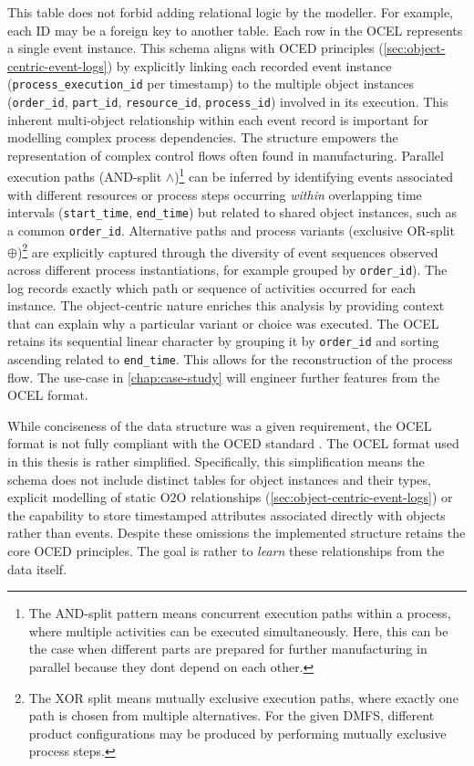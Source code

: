 This table does not forbid adding relational logic by the modeller. For example, each ID may be a foreign key to another table. Each row in the OCEL represents a single event instance. This schema aligns with OCED principles (\autoref{sec:object-centric-event-logs}) by explicitly linking each recorded event instance (\texttt{process\_execution\_id} per timestamp) to the multiple object instances (\texttt{order\_id}, \texttt{part\_id}, \texttt{resource\_id}, \texttt{process\_id}) involved in its execution. This inherent multi-object relationship within each event record is important for modelling complex process dependencies. The structure empowers the representation of complex control flows often found in manufacturing. Parallel execution paths (AND-split $\wedge$)\footnote{The AND-split pattern means concurrent execution paths within a process, where multiple activities can be executed simultaneously. Here, this can be the case when different parts are prepared for further manufacturing in parallel because they dont depend on each other.} can be inferred by identifying events associated with different resources or process steps occurring \textit{within} overlapping time intervals (\texttt{start\_time}, \texttt{end\_time}) but related to shared object instances, such as a common \texttt{order\_id}. Alternative paths and process variants (exclusive OR-split $\oplus$)\footnote{The XOR split means mutually exclusive execution paths, where exactly one path is chosen from multiple alternatives. For the given DMFS, different product configurations may be produced by performing mutually exclusive process steps.} are explicitly captured through the diversity of event sequences observed across different process instantiations, for example grouped by \texttt{order\_id}). The log records exactly which path or sequence of activities occurred for each instance. The object-centric nature enriches this analysis by providing context that can explain why a particular variant or choice was executed. The OCEL retains its sequential linear character by grouping it by \texttt{order\_id} and sorting ascending related to \texttt{end\_time}. This allows for the reconstruction of the process flow. The use-case in \autoref{chap:case-study} will engineer further features from the OCEL format.

While conciseness of the data structure was a given requirement, the OCEL format is not fully compliant with the OCED standard \autocite{van2023object}. The OCEL format used in this thesis is rather simplified. Specifically, this simplification means the schema does not include distinct tables for object instances and their types, explicit modelling of static O2O relationships (\autoref{sec:object-centric-event-logs}) or the capability to store timestamped attributes associated directly with objects rather than events. Despite these omissions the implemented structure retains the core OCED principles. The goal is rather to \textit{learn} these relationships from the data itself.

